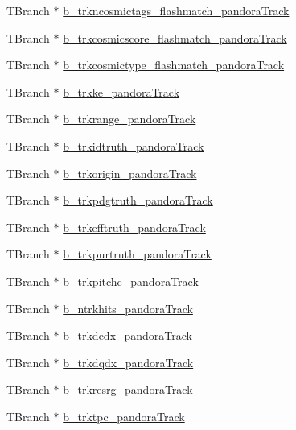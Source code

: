 \begin{DoxyCompactItemize}
\item 
T\-Branch $\ast$ \hyperlink{classanatree_ab116c8b3fa8f5b41fef9521a63f1760d}{b\-\_\-trkncosmictags\-\_\-flashmatch\-\_\-pandora\-Track}
\item 
T\-Branch $\ast$ \hyperlink{classanatree_a3321e189e7b2ec484e2be9d93374eaf1}{b\-\_\-trkcosmicscore\-\_\-flashmatch\-\_\-pandora\-Track}
\item 
T\-Branch $\ast$ \hyperlink{classanatree_acebcf60585925122544cbe6aa3383f17}{b\-\_\-trkcosmictype\-\_\-flashmatch\-\_\-pandora\-Track}
\item 
T\-Branch $\ast$ \hyperlink{classanatree_ad366d472a32e99ee6d30cfeb3cbd86a1}{b\-\_\-trkke\-\_\-pandora\-Track}
\item 
T\-Branch $\ast$ \hyperlink{classanatree_aa7d9036d8d92248e13100afced0b115b}{b\-\_\-trkrange\-\_\-pandora\-Track}
\item 
T\-Branch $\ast$ \hyperlink{classanatree_a2d6d7397cd6d0234946df824ea5ebfa0}{b\-\_\-trkidtruth\-\_\-pandora\-Track}
\item 
T\-Branch $\ast$ \hyperlink{classanatree_a1a5ee65d607fe38f9b2c219aad3fefb3}{b\-\_\-trkorigin\-\_\-pandora\-Track}
\item 
T\-Branch $\ast$ \hyperlink{classanatree_a656e8c06ac7283b3eb376f152a04b281}{b\-\_\-trkpdgtruth\-\_\-pandora\-Track}
\item 
T\-Branch $\ast$ \hyperlink{classanatree_a6546472f5d800c2482b89cb413cb9980}{b\-\_\-trkefftruth\-\_\-pandora\-Track}
\item 
T\-Branch $\ast$ \hyperlink{classanatree_af39e82004212f99644a3b15a4152e6a8}{b\-\_\-trkpurtruth\-\_\-pandora\-Track}
\item 
T\-Branch $\ast$ \hyperlink{classanatree_a8f41f7a2c36e4ffd56830daab869a2e9}{b\-\_\-trkpitchc\-\_\-pandora\-Track}
\item 
T\-Branch $\ast$ \hyperlink{classanatree_aa233fe3244e43fa21f61ff0d5eb366ba}{b\-\_\-ntrkhits\-\_\-pandora\-Track}
\item 
T\-Branch $\ast$ \hyperlink{classanatree_a7602085679da71b3a746aef20d82f983}{b\-\_\-trkdedx\-\_\-pandora\-Track}
\item 
T\-Branch $\ast$ \hyperlink{classanatree_abe95194f0f763762a0748e568c2e9402}{b\-\_\-trkdqdx\-\_\-pandora\-Track}
\item 
T\-Branch $\ast$ \hyperlink{classanatree_a269b03fc1d1c98f519cf86eee5ebaa7c}{b\-\_\-trkresrg\-\_\-pandora\-Track}
\item 
T\-Branch $\ast$ \hyperlink{classanatree_a83931160f7d55dc1729d19d5596c08fb}{b\-\_\-trktpc\-\_\-pandora\-Track}

\end{DoxyCompactItemize}
